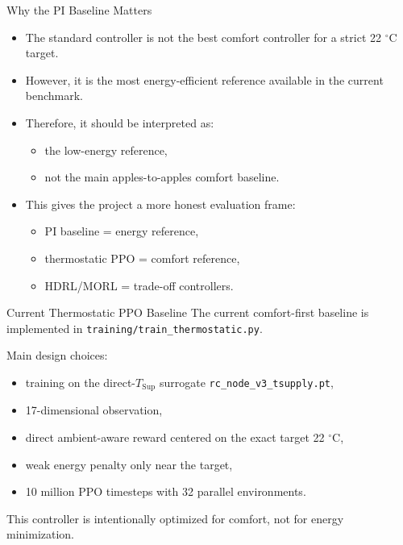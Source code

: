 \documentclass[aspectratio=169,11pt]{beamer}
\newcommand{\degc}{\ensuremath{^\circ\mathrm{C}}}
\begin{document}
\begin{frame}{Why the PI Baseline Matters}
  \begin{itemize}
    \item The standard controller is not the best comfort controller for a strict 22 \degc{} target.
    \item However, it is the most energy-efficient reference available in the current benchmark.
    \item Therefore, it should be interpreted as:
    \begin{itemize}
      \item the low-energy reference,
      \item not the main apples-to-apples comfort baseline.
    \end{itemize}
    \item This gives the project a more honest evaluation frame:
    \begin{itemize}
      \item PI baseline = energy reference,
      \item thermostatic PPO = comfort reference,
      \item HDRL/MORL = trade-off controllers.
    \end{itemize}
  \end{itemize}
\end{frame}

\begin{frame}{Current Thermostatic PPO Baseline}
  The current comfort-first baseline is implemented in \texttt{training/train\_thermostatic.py}.

  \vspace{0.5em}
  Main design choices:
  \begin{itemize}
    \item training on the direct-$T_{\mathrm{Sup}}$ surrogate \texttt{rc\_node\_v3\_tsupply.pt},
    \item 17-dimensional observation,
    \item direct ambient-aware reward centered on the exact target 22 \degc{},
    \item weak energy penalty only near the target,
    \item 10 million PPO timesteps with 32 parallel environments.
  \end{itemize}

  This controller is intentionally optimized for comfort, not for energy minimization.
\end{frame}
\end{document}
